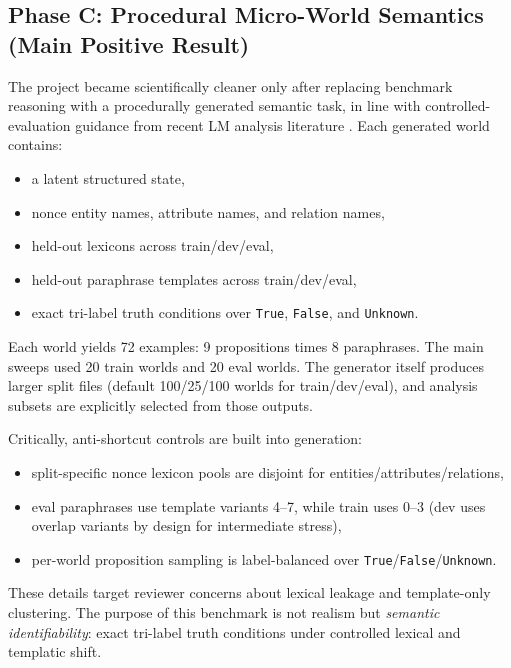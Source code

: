 \documentclass[11pt]{article}
\begin{document}
\subsection{Phase C: Procedural Micro-World Semantics (Main Positive Result)}
The project became scientifically cleaner only after replacing benchmark reasoning with a procedurally generated semantic task, in line with controlled-evaluation guidance from recent LM analysis literature \cite{liang2022holistic}.
Each generated world contains:
\begin{itemize}
  \item a latent structured state,
  \item nonce entity names, attribute names, and relation names,
  \item held-out lexicons across train/dev/eval,
  \item held-out paraphrase templates across train/dev/eval,
  \item exact tri-label truth conditions over \texttt{True}, \texttt{False}, and \texttt{Unknown}.
\end{itemize}

Each world yields 72 examples: 9 propositions times 8 paraphrases.
The main sweeps used 20 train worlds and 20 eval worlds.
The generator itself produces larger split files (default 100/25/100 worlds for train/dev/eval), and analysis subsets are explicitly selected from those outputs.

Critically, anti-shortcut controls are built into generation:
\begin{itemize}
  \item split-specific nonce lexicon pools are disjoint for entities/attributes/relations,
  \item eval paraphrases use template variants 4--7, while train uses 0--3 (dev uses overlap variants by design for intermediate stress),
  \item per-world proposition sampling is label-balanced over \texttt{True}/\texttt{False}/\texttt{Unknown}.
\end{itemize}
These details target reviewer concerns about lexical leakage and template-only clustering.
The purpose of this benchmark is not realism but \emph{semantic identifiability}: exact tri-label truth conditions under controlled lexical and templatic shift.
\end{document}
